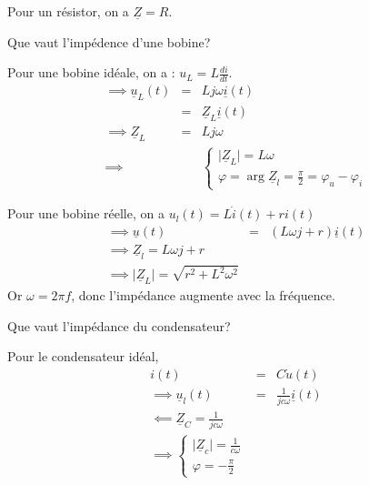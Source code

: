 \begin{eg}[Exemples]
    Pour un résistor, on a \(\underline{Z} = R\). \par
    Que vaut l'impédence d'une bobine? \par
    Pour une bobine idéale, on a : \(u_{L} = L \frac{di}{dt}\). 
    \begin{eqnarray*}
        \implies \underline{u}_{L}(t)  &=& Lj \omega \underline{i}(t) \\
        &=& \underline{Z}_{L} \underline{i}(t) \\
        \implies \underline{Z}_{L} &=& Lj \omega\\
        \implies && \begin{cases}
            \lvert \underline{Z}_{L} \rvert = L \omega \\
            \varphi = \arg \underline{Z}_{l} = \frac{\pi}{2} = \varphi_{u} - \varphi_{i}
        \end{cases}
    \end{eqnarray*}

    \begin{remark}
        Pour une bobine réelle, on a \(u_{l}(t)  = L \dot{i}(t)  + r i(t) \)
        \begin{eqnarray*}
            \implies \underline{u}(t) &=& (L \omega j +r) \underline{i}(t) \\
            \implies \underline{Z}_{l} = L \omega j +r \\
            \implies \lvert \underline{Z}_{L} \rvert = \sqrt{r^{2}+ L^{2} \omega^{2}} 
        \end{eqnarray*}
         Or \(\omega = 2 \pi f \), donc l'impédance augmente avec la fréquence. 
    \end{remark}

    Que vaut l'impédance du condensateur? \par
    Pour le condensateur idéal, 
    \begin{eqnarray*}
        i(t) &=& C\dot{u}(t) \\
        \implies \underline{u}_{l}(t) &=& \frac{1}{jc \omega}\underline{i}(t) \\
        \impliedby \underline{Z}_{C} = \frac{1}{jc \omega} \\
        \implies \begin{cases}
            \lvert \underline{Z}_{c} \rvert = \frac{1}{c \omega} \\
            \varphi = -\frac{\pi}{2} 
        \end{cases}
    \end{eqnarray*}
    
\end{eg}

